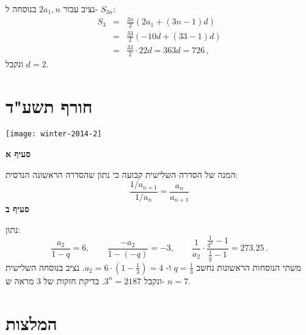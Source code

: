 נציב עבור
$2a_1,n$
בנוסחה ל-%
$S_{3n}$:
\begin{eqnarray*}
S_3&=&\frac{3n}{2}(2a_1+(3n-1)d)\\
&=&\frac{33}{2}(-10d+(33-1)d)\\
&=&\frac{33}{2}\cdot 22d = 363d=726\,,
\end{eqnarray*}
ונקבל 
$d=2$.

\np

\section{חורף תשע"ד}

\begin{center}
\texttt{[image: winter-2014-2]}
\end{center}
\vspace{-2ex}
\textbf{סעיף א}

המנה של הסדרה השלישית קבועה כי נתון שהסדרה הראשונה הנדסית:
\[
\frac{1/a_{n+1}}{1/a_n}=\frac{a_n}{a_{n+1}}
\]
\textbf{סעיף ב}

נתון:
\[
\frac{a_2}{1-q}=6,\quad\quad \frac{-a_2}{1-(-q)}= -3,\quad\quad \frac{1}{a_2}\cdot\frac{\displaystyle\frac{1}{q^n}-1}{\displaystyle\frac{1}{q}-1}=273.25\,.
\]
משתי הנוסחות הראשונות נחשב
$q=\frac{1}{3}$
ו-%
$a_2=6\cdot \left(1-\frac{1}{3}\right)=4$.
נציב בנוסחה השלישית ונקבל
$3^n=2187$.
בדיקת חזקות של
$3$
מראה ש-%
$n=7$.




\np
\section{המלצות}

